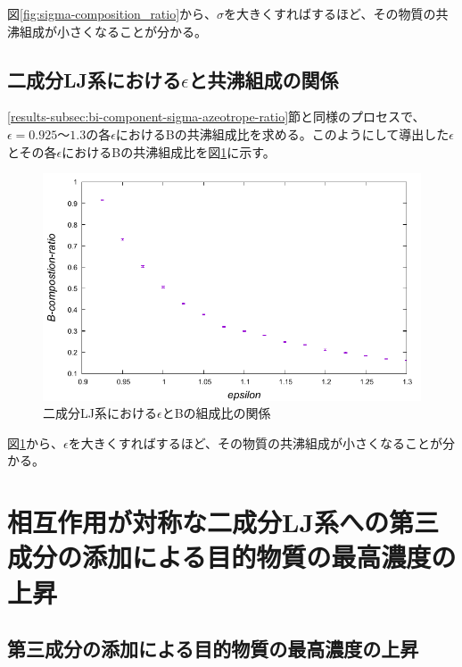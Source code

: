 \documentclass[titlepage]{jsreport}
\begin{document}
図\ref{fig:sigma-composition_ratio}から、$\sigma$を大きくすればするほど、その物質の共沸組成が小さくなることが分かる。

\newpage
\subsection{二成分LJ系における$\epsilon$と共沸組成の関係} \label{results-subsec:bi-component-epsilon-azeotrope-ratio}
\ref{results-subsec:bi-component-sigma-azeotrope-ratio}節と同様のプロセスで、$\epsilon=0.925〜1.3$の各$\epsilon$におけるBの共沸組成比を求める。このようにして導出した$\epsilon$とその各$\epsilon$におけるBの共沸組成比を図\ref{fig:epsilon-composition_ratio}に示す。

\begin{figure}[htbp]
    \begin{center}
        \includegraphics[width=14cm]{fig/epsilon-composition_ratio/epsilon-composition_ratio.pdf}
    \end{center}
    \caption{二成分LJ系における$\epsilon$とBの組成比の関係}
    \label{fig:epsilon-composition_ratio}
\end{figure}

図\ref{fig:epsilon-composition_ratio}から、$\epsilon$を大きくすればするほど、その物質の共沸組成が小さくなることが分かる。


\newpage
\section{相互作用が対称な二成分LJ系への第三成分の添加による目的物質の最高濃度の上昇} \label{results-sec:bi-component-addition-of-3rd-component-highest-purity}
\subsection{第三成分の添加による目的物質の最高濃度の上昇} \label{results-subsec:bi-component-addition-of-3rd-component-highest-purity}
\end{document}
